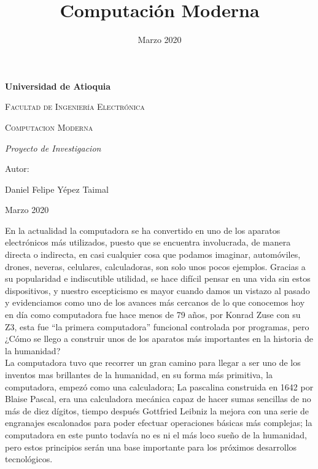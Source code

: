 \documentclass{article}
\title{Computación Moderna}
\date{Marzo 2020}
\begin{document}
\begin{titlepage}
\centering
{\bfseries\LARGE Universidad de Atioquia\par}
\vspace{1cm}
{\scshape\Large Facultad de Ingenier\'ia Electr\'onica \par}
\vspace{3cm}
{\scshape\Huge Computacion Moderna \par}
\vspace{3cm}
{\itshape\Large Proyecto de Investigacion \par}
\vfill
{\Large Autor: \par}
{\Large Daniel Felipe Y\'epez Taimal \par}
\vfill
{\Large Marzo 2020 \par}
\end{titlepage}


\maketitle

En la actualidad la computadora se ha convertido en uno de los aparatos electrónicos más utilizados, puesto que se encuentra involucrada, de manera directa o indirecta, en casi cualquier cosa que podamos imaginar, automóviles, drones, neveras, celulares, calculadoras, son solo unos pocos ejemplos. Gracias a su popularidad e indiscutible utilidad, se hace difícil pensar en una vida sin estos dispositivos, y nuestro escepticismo es mayor cuando damos un vistazo al pasado y evidenciamos como uno de los avances más cercanos de lo que conocemos hoy en día como computadora fue hace menos de 79 años, por Konrad Zuse con su Z3, esta fue “la primera computadora” funcional controlada por programas, pero ¿Cómo se  llego a construir unos de los aparatos más importantes en la historia de la humanidad?\\

La computadora tuvo que recorrer un gran camino para llegar a ser uno de los inventos mas brillantes de la humanidad, en su forma más primitiva, la computadora, empezó como una calculadora; La pascalina construida en 1642 por Blaise Pascal, era una calculadora mecánica capaz de hacer sumas sencillas de no más de diez dígitos, tiempo después Gottfried Leibniz la mejora con una serie de engranajes escalonados para poder efectuar operaciones básicas más complejas; la computadora en este punto todavía no es ni el más loco sueño de la humanidad, pero estos principios serán una base importante para los próximos desarrollos tecnológicos.\\
\end{document}
